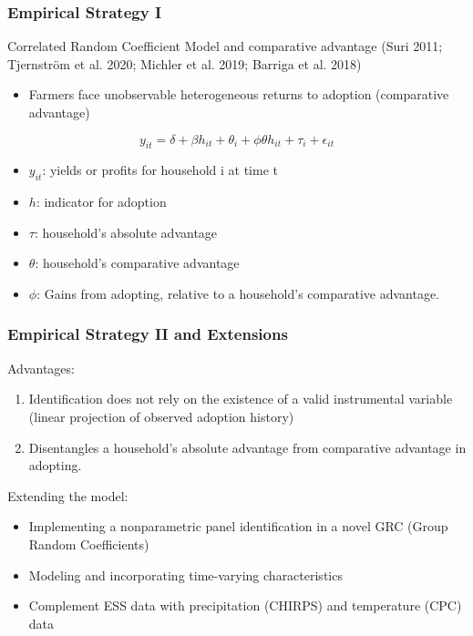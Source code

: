 \documentclass{beamer}
\begin{document}
\begin{frame}
\frametitle{Empirical Strategy I}

Correlated Random Coefficient Model and comparative advantage (Suri 2011; Tjernstr\"{o}m et al. 2020; Michler et al. 2019; Barriga et al. 2018)


\begin{itemize}
    \item Farmers face unobservable heterogeneous returns to adoption (comparative advantage)
\end{itemize}  

\begin{center}
$$
    y_{it}= \delta + \beta h_{it} + \theta_{i} + \phi\theta h_{it} + \tau_{i} + \epsilon_{it}
$$  
\end{center}

\begin{itemize}
    \item $y_{it}$: yields or profits for household i at time t
    \item $h$:  indicator for adoption
    \item $\tau$:  household’s absolute advantage
    \item $\theta$: household’s comparative advantage
    \item $\phi$: Gains from adopting, relative to a household’s comparative advantage. 
\end{itemize}

\end{frame}


\begin{frame}
\frametitle{Empirical Strategy II and Extensions}

Advantages:
\begin{enumerate}
    \item Identification does not rely on the existence of a valid instrumental variable (linear projection of observed adoption history)
    \item Disentangles a household’s absolute advantage from comparative advantage in adopting. 
\end{enumerate}

Extending the model:

\begin{itemize}
    \item Implementing a nonparametric panel identification in a novel GRC (Group Random Coefficients)
    \item Modeling and incorporating time-varying characteristics 
    \item Complement ESS data with precipitation (CHIRPS) and temperature (CPC) data
\end{itemize}  
\end{frame}
\end{document}

